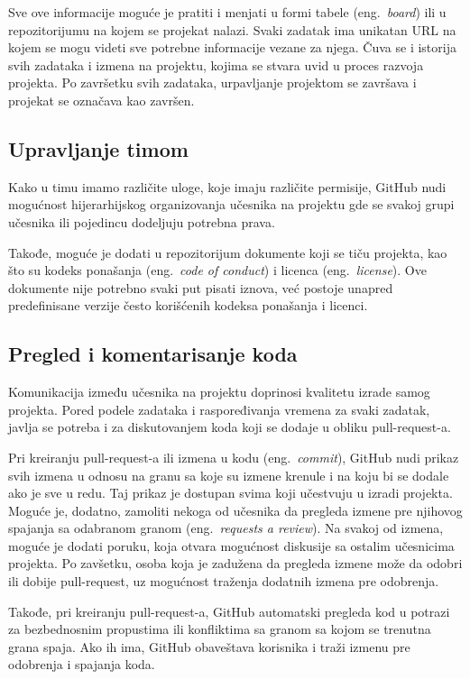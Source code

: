 \documentclass[12pt]{report}
\begin{document}
Sve ove informacije moguće je pratiti i menjati u formi tabele (eng.\ \textit{board}) ili u repozitorijumu na kojem se projekat nalazi. Svaki zadatak ima unikatan URL na kojem se mogu videti sve potrebne informacije vezane za njega. Čuva se i istorija svih zadataka i izmena na projektu, kojima se stvara uvid u proces razvoja projekta. Po završetku svih zadataka, urpavljanje projektom se završava i projekat se označava kao završen.

\subsection{Upravljanje timom}
Kako u timu imamo različite uloge, koje imaju različite permisije, GitHub nudi mogućnost hijerarhijskog organizovanja učesnika na projektu gde se svakoj grupi učesnika ili pojedincu dodeljuju potrebna prava.

Takođe, moguće je dodati u repozitorijum dokumente koji se tiču projekta, kao što su kodeks ponašanja (eng.\ \textit{code of conduct}) i licenca (eng.\ \textit{license}). Ove dokumente nije potrebno svaki put pisati iznova, već postoje unapred predefinisane verzije često korišćenih kodeksa ponašanja i licenci.

\subsection{Pregled i komentarisanje koda}
Komunikacija između učesnika na projektu doprinosi kvalitetu izrade samog projekta. Pored podele zadataka i raspoređivanja vremena za svaki zadatak, javlja se potreba i za diskutovanjem koda koji se dodaje u obliku pull-request-a.

Pri kreiranju pull-request-a ili izmena u kodu (eng.\ \textit{commit}), GitHub nudi prikaz svih izmena u odnosu na granu sa koje su izmene krenule i na koju bi se dodale ako je sve u redu. Taj prikaz je dostupan svima koji učestvuju u izradi projekta. Moguće je, dodatno, zamoliti nekoga od učesnika da pregleda izmene pre njihovog spajanja sa odabranom granom (eng.\ \textit{requests a review}). Na svakoj od izmena, moguće je dodati poruku, koja otvara mogućnost diskusije sa ostalim učesnicima projekta. Po zavšetku, osoba koja je zadužena da pregleda izmene može da odobri ili dobije pull-request, uz mogućnost traženja dodatnih izmena pre odobrenja.

Takođe, pri kreiranju pull-request-a, GitHub automatski pregleda kod u potrazi za bezbednosnim propustima ili konfliktima sa granom sa kojom se trenutna grana spaja. Ako ih ima, GitHub obaveštava korisnika i traži izmenu pre odobrenja i spajanja koda.
\end{document}
